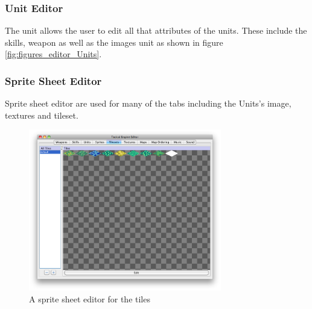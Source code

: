 \subsubsection{Unit Editor}
\label{ssub:unit_editors}
The unit allows the user to edit all that attributes of the units. These include the skills, weapon as well as the images unit as shown in figure \ref{fig:figures_editor_Units}. 


\subsubsection{Sprite Sheet Editor}
Sprite sheet editor are used for many of the tabs including the Units's image, textures and tileset.
\begin{figure}[htbp]
	\centering
		\includegraphics[width=0.75\textwidth]{figures/editor/tileset_edit.png}
	\caption{A sprite sheet  editor for the tiles}
	\label{fig:figures_editor_tileset_edit}
\end{figure}

